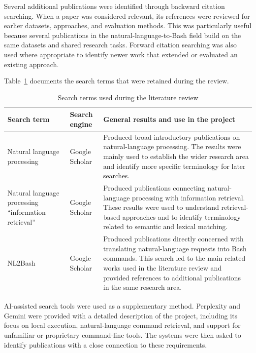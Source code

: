 Several additional publications were identified through backward citation searching. When a paper was considered relevant, its references were reviewed for earlier datasets, approaches, and evaluation methods. This was particularly useful because several publications in the natural-language-to-Bash field build on the same datasets and shared research tasks. Forward citation searching was also used where appropriate to identify newer work that extended or evaluated an existing approach.

Table~\ref{tab:literature-search-terms} documents the search terms that were retained during the review. 

\begin{table}[htbp]
    \centering
    \caption{Search terms used during the literature review}
    \label{tab:literature-search-terms}

    \renewcommand{\arraystretch}{1.5}

    \begin{tabular}{p{3.5cm} p{3cm} p{7.5cm}}
        \hline
        \textbf{Search term} &
        \textbf{Search engine} &
        \textbf{General results and use in the project} \\
        \hline

            Natural language processing & Google Scholar & Produced broad introductory publications on natural-language processing. The results were mainly used to establish the wider research area and identify more specific terminology for later searches. \\ 
        
            Natural language processing ``information retrieval'' & Google Scholar & Produced publications connecting natural-language processing with information retrieval. These results were used to understand retrieval-based approaches and to identify terminology related to semantic and lexical matching. \\ 
        
            NL2Bash & Google Scholar & Produced publications directly concerned with translating natural-language requests into Bash commands. This search led to the main related works used in the literature review and provided references to additional publications in the same research area. \\

        \hline
    \end{tabular}
\end{table}

AI-assisted search tools were used as a supplementary method. Perplexity and Gemini were
provided with a detailed description of the project, including its focus on local execution, natural-language command retrieval, and support for unfamiliar or proprietary command-line tools. The systems were then asked to identify publications with a close connection to these requirements.

